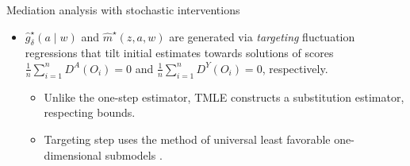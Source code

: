 \documentclass{beamer}
\begin{document}

\begin{frame}[c]{Mediation analysis with stochastic interventions}

\begin{center}
\begin{itemize}
  \itemsep10pt
  \item $\hat{g}_{\delta}^{\star}(a \mid w)$ and $\hat{m}^{\star}(z,a,w)$ are
    generated via \textit{targeting} fluctuation regressions that tilt initial
    estimates towards solutions of scores
    $\frac{1}{n}\sum_{i=1}^n D^A(O_i) = 0$ and
    $\frac{1}{n}\sum_{i=1}^n D^Y(O_i) = 0$, respectively.
    \begin{itemize}
      \item Unlike the one-step estimator, TMLE constructs a substitution
        estimator, respecting bounds.
      \item Targeting step uses the method of universal least favorable
        one-dimensional submodels \citep{vdl2016one}.
    \end{itemize}
\end{itemize}
\end{center}

\note{
}

\end{frame}

\end{document}
